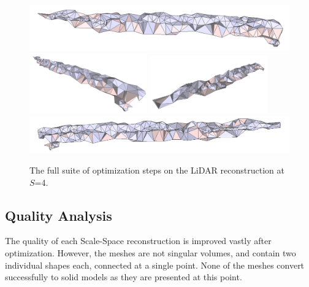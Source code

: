 \documentclass[12pt]{drexelthesis}
\let\Oldsubsection\subsection
\renewcommand{\subsection}{\FloatBarrier\Oldsubsection}
\begin{document}
\begin{figure}[!ht]
	\centering
		\includegraphics[width=5in]{real-lab-scans/optimizedNeat/scalespace4everything00.png}
		\includegraphics[width=2in]{real-lab-scans/optimizedNeat/scalespace4everything01.png}
		\includegraphics[width=2in]{real-lab-scans/optimizedNeat/scalespace4everything02.png}
		\includegraphics[width=5in]{real-lab-scans/optimizedNeat/scalespace4everything03.png}
		\caption[The full suite of optimization steps on the LiDAR reconstruction at $S$=4.]{\centering The full suite of optimization steps on the LiDAR reconstruction at $S$=4.}
	\label{lidar:scalespace4everything}
\end{figure}

\subsection{Quality Analysis}

The quality of each Scale-Space reconstruction is improved vastly after optimization. However, the meshes are not singular volumes, and contain two individual shapes each, connected at a single point. None of the meshes convert successfully to solid models as they are presented at this point.
\end{document}
